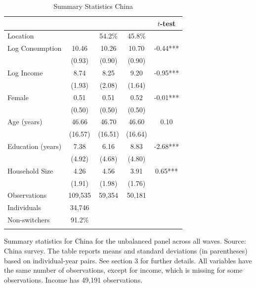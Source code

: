 \begin{table}[htbp] \centering \caption{Summary Statistics China}\label{tab:summary_stats_CHN_unb_2waves} \begin{threeparttable} \begin{tabular}{l cccc} \toprule
 &  &  &  & $t$-test \\
\midrule
Location &  &   54.2\% &   45.8\% &  \\  \addlinespace \addlinespace
Log Consumption & 10.46 & 10.26 & 10.70 & -0.44*** \\
 & (0.93) & (0.90) & (0.90) &  \\  \addlinespace
Log Income & 8.74 & 8.25 & 9.20 & -0.95*** \\
 & (1.93) & (2.08) & (1.64) &  \\  \addlinespace
Female & 0.51 & 0.51 & 0.52 & -0.01*** \\
 & (0.50) & (0.50) & (0.50) &  \\  \addlinespace
Age (years) & 46.66 & 46.70 & 46.60 & 0.10 \\
 & (16.57) & (16.51) & (16.64) &  \\  \addlinespace
Education (years) & 7.38 & 6.16 & 8.83 & -2.68*** \\
 & (4.92) & (4.68) & (4.80) &  \\  \addlinespace
Household Size & 4.26 & 4.56 & 3.91 & 0.65*** \\
 & (1.91) & (1.98) & (1.76) &  \\  \addlinespace


\cmidrule{2-5}
Observations & 109,535 & 59,354 & 50,181 &  \\  \addlinespace
Individuals & 34,746 &  &  &  \\
Non-switchers &   91.2\% &  &  &  \\  \addlinespace
\bottomrule \end{tabular} \begin{tablenotes}[flushleft] \footnotesize \item{Summary statistics for China for the unbalanced panel across all waves. Source: China survey. The table reports means and standard deviations (in parentheses) based on individual-year pairs. See section 3 for further details. All variables have the same number of observations, except for income, which is missing for some observations. Income has 49,191 observations.} \end{tablenotes} \end{threeparttable} \end{table}
